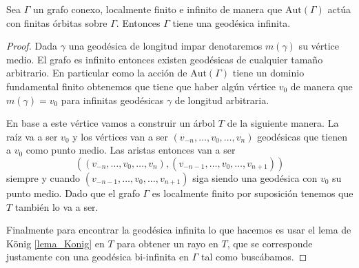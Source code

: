 \documentclass[tesis.tex]{subfiles}
\newcommand{\aut}{\text{Aut}}
\begin{document}
\begin{lema}\label{lema_geodesica_biinfinita}
	Sea $\Gamma$ un grafo conexo, localmente finito e infinito de manera que $\aut(\Gamma)$ actúa con finitas órbitas sobre $\Gamma$.
	Entonces $\Gamma$ tiene una geodésica infinita.
\end{lema}
\begin{proof}
	Dada $\gamma$ una geodésica de longitud impar denotaremos $m(\gamma)$ su vértice medio.	
	El grafo es infinito entonces existen geodésicas de cualquier tamaño arbitrario.
	En particular como la acción de $\aut(\Gamma)$ tiene un dominio fundamental finito obtenemos que tiene que haber algún vértice $v_0$ de manera que $m(\gamma) = v_0$ para infinitas geodésicas $\gamma$ de longitud arbitraria.
	
	En base a este vértice vamos a construir un árbol $T$ de la siguiente manera.
	La raíz va a ser $v_0$ y los vértices van a ser $(v_{-n},\dots, v_0,\dots,v_n)$ geodésicas que tienen a $v_0$ como punto medio.
	Las aristas entonces van a ser 
	\[
		((v_{-n},\dots, v_0,\dots,v_n), (v_{-n-1},\dots, v_0,\dots,v_{n+1}))
	\]
	siempre y cuando $(v_{-n-1},\dots, v_0,\dots,v_{n+1})$ siga siendo una geodésica con $v_0$ su punto medio.
	Dado que el grafo $\Gamma$ es localmente finito por suposición tenemos que $T$ también lo va a ser.
	
	Finalmente para encontrar la geodésica infinita lo que hacemos es usar el lema de König \ref{lema_Konig} en $T$ para obtener un rayo en $T$, que se corresponde justamente con una geodésica bi-infinita en $\Gamma$ tal como buscábamos.
	
\end{proof}
\end{document}
